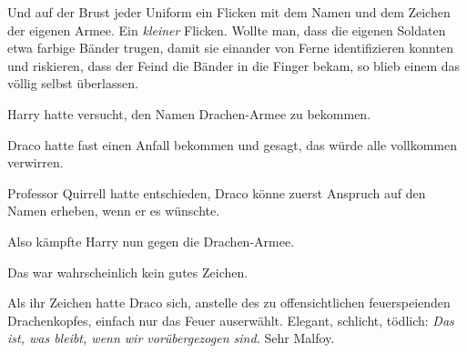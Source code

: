 Und auf der Brust jeder Uniform ein Flicken mit dem Namen und dem Zeichen der eigenen Armee. Ein \emph{kleiner} Flicken. Wollte man, dass die eigenen Soldaten etwa farbige Bänder trugen, damit sie einander von Ferne identifizieren konnten und riskieren, dass der Feind die Bänder in die Finger bekam, so blieb einem das völlig selbst überlassen.

Harry hatte versucht, den Namen Drachen-Armee zu bekommen.

Draco hatte fast einen Anfall bekommen und gesagt, das würde alle vollkommen verwirren.

Professor Quirrell hatte entschieden, Draco könne zuerst Anspruch auf den Namen erheben, wenn er es wünschte.

Also kämpfte Harry nun gegen die Drachen-Armee.%

Das war wahrscheinlich kein gutes Zeichen.

Als ihr Zeichen hatte Draco sich, anstelle des zu offensichtlichen feuerspeienden Drachenkopfes, einfach nur das Feuer auserwählt. Elegant, schlicht, tödlich: \emph{Das ist, was bleibt, wenn wir vorübergezogen sind.} Sehr Malfoy.

